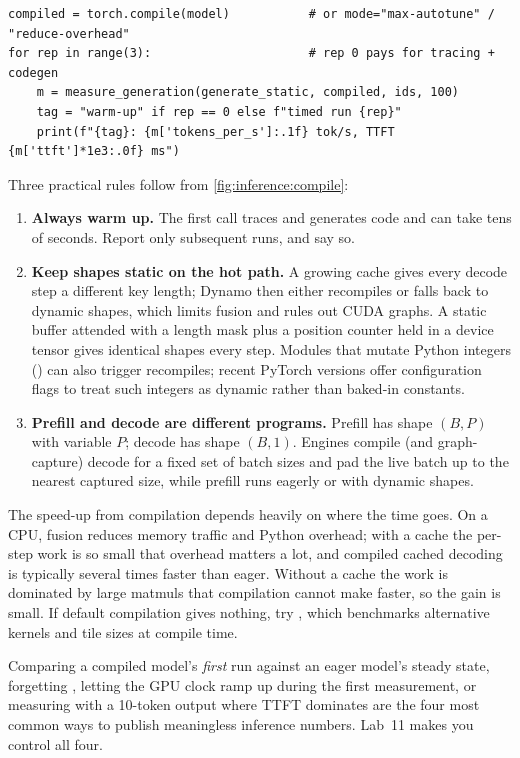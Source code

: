 \begin{lstlisting}[caption={Compiling and benchmarking with warm-up runs.},label={lst:inference:compile}]
compiled = torch.compile(model)           # or mode="max-autotune" / "reduce-overhead"
for rep in range(3):                      # rep 0 pays for tracing + codegen
    m = measure_generation(generate_static, compiled, ids, 100)
    tag = "warm-up" if rep == 0 else f"timed run {rep}"
    print(f"{tag}: {m['tokens_per_s']:.1f} tok/s, TTFT {m['ttft']*1e3:.0f} ms")
\end{lstlisting}

Three practical rules follow from \cref{fig:inference:compile}:
\begin{enumerate}
  \item \textbf{Always warm up.} The first call traces and generates code and can take tens of
    seconds. Report only subsequent runs, and say so.
  \item \textbf{Keep shapes static on the hot path.} A growing  cache gives every
    decode step a different key length; Dynamo then either recompiles or falls back to dynamic
    shapes, which limits fusion and rules out CUDA graphs. A static buffer attended with a length
    mask plus a position counter held in a device tensor gives identical shapes every step. Modules that mutate Python integers
    () can also trigger recompiles; recent PyTorch versions offer configuration
    flags to treat such integers as dynamic rather than baked-in constants.
  \item \textbf{Prefill and decode are different programs.} Prefill has shape $(B,P)$ with variable
    $P$; decode has shape $(B,1)$. Engines compile (and graph-capture) decode for a fixed set of
    batch sizes and pad the live batch up to the nearest captured size, while prefill runs eagerly
    or with dynamic shapes.
\end{enumerate}

The speed-up from compilation depends heavily on where the time goes. On a CPU, fusion reduces
memory traffic and Python overhead; with a cache the per-step work is so small that overhead
matters a lot, and compiled cached decoding is typically several times faster than eager. Without
a cache the work is dominated by large matmuls that compilation cannot make faster, so the gain is
small. If default compilation gives nothing, try , which benchmarks
alternative kernels and tile sizes at compile time.

\begin{pitfall}
Comparing a compiled model's \emph{first} run against an eager model's steady state, forgetting
, letting the GPU clock ramp up during the first measurement, or measuring
with a 10-token output where TTFT dominates are the four most common ways to publish meaningless
inference numbers. Lab~11 makes you control all four.
\end{pitfall}


